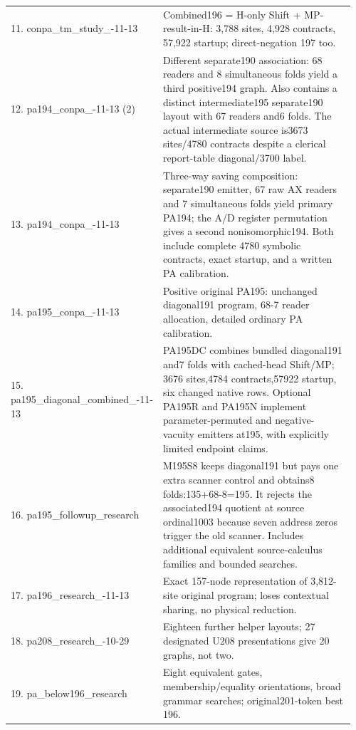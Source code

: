 \begin{longtable}{@{}p{0.34\linewidth}p{0.62\linewidth}@{}}
11. conpa\_\allowbreak tm\_\allowbreak study\_\allowbreak 2026-11-13 & Combined196 = H-only Shift + MP-result-in-H: 3,788 sites, 4,928 contracts, 57,922 startup; direct-negation 197 too.\\[5pt]
12. pa194\_\allowbreak conpa\_\allowbreak 2026-11-13 (2) & Different separate190 association: 68 readers and 8 simultaneous folds yield a third positive194 graph. Also contains a distinct intermediate195 separate190 layout with 67 readers and6 folds. The actual intermediate source is3673 sites/4780 contracts despite a clerical report-table diagonal/3700 label.\\[5pt]
13. pa194\_\allowbreak conpa\_\allowbreak 2026-11-13 & Three-way saving composition: separate190 emitter, 67 raw AX readers and 7 simultaneous folds yield primary PA194; the A/D register permutation gives a second nonisomorphic194. Both include complete 4780 symbolic contracts, exact startup, and a written PA calibration.\\[5pt]
14. pa195\_\allowbreak conpa\_\allowbreak 2026-11-13 & Positive original PA195: unchanged diagonal191 program, 68-7 reader allocation, detailed ordinary PA calibration.\\[5pt]
15. pa195\_\allowbreak diagonal\_\allowbreak combined\_\allowbreak 2026-11-13 & PA195DC combines bundled diagonal191 and7 folds with cached-head Shift/MP; 3676 sites,4784 contracts,57922 startup, six changed native rows. Optional PA195R and PA195N implement parameter-permuted and negative-vacuity emitters at195, with explicitly limited endpoint claims.\\[5pt]
16. pa195\_\allowbreak followup\_\allowbreak research & M195S8 keeps diagonal191 but pays one extra scanner control and obtains8 folds:135+68-8=195. It rejects the associated194 quotient at source ordinal1003 because seven address zeros trigger the old scanner. Includes additional equivalent source-calculus families and bounded searches.\\[5pt]
17. pa196\_\allowbreak research\_\allowbreak 2026-11-13 & Exact 157-node representation of 3,812-site original program; loses contextual sharing, no physical reduction.\\[5pt]
18. pa208\_\allowbreak research\_\allowbreak 2026-10-29 & Eighteen further helper layouts; 27 designated U208 presentations give 20 graphs, not two.\\[5pt]
19. pa\_\allowbreak below196\_\allowbreak research & Eight equivalent gates, membership/equality orientations, broad grammar searches; original201-token best 196.\\[5pt]

\end{longtable}
